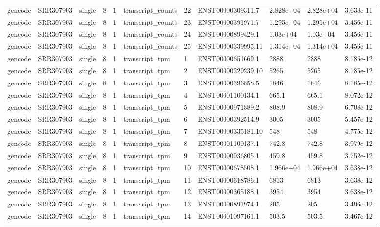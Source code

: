 \begin{tabular}{lllllllllll}
gencode & SRR307903 & single & 8 & 1 & transcript\_counts & 22 & ENST00000309311.7 & 2.828e+04 & 2.828e+04 & 3.638e-11 \\
gencode & SRR307903 & single & 8 & 1 & transcript\_counts & 23 & ENST00000391971.7 & 1.295e+04 & 1.295e+04 & 3.456e-11 \\
gencode & SRR307903 & single & 8 & 1 & transcript\_counts & 24 & ENST00000899429.1 & 1.03e+04 & 1.03e+04 & 3.456e-11 \\
gencode & SRR307903 & single & 8 & 1 & transcript\_counts & 25 & ENST00000339995.11 & 1.314e+04 & 1.314e+04 & 3.456e-11 \\
gencode & SRR307903 & single & 8 & 1 & transcript\_tpm & 1 & ENST00000651669.1 & 2888 & 2888 & 8.185e-12 \\
gencode & SRR307903 & single & 8 & 1 & transcript\_tpm & 2 & ENST00000229239.10 & 5265 & 5265 & 8.185e-12 \\
gencode & SRR307903 & single & 8 & 1 & transcript\_tpm & 3 & ENST00000396858.5 & 1846 & 1846 & 8.185e-12 \\
gencode & SRR307903 & single & 8 & 1 & transcript\_tpm & 4 & ENST00001100134.1 & 665.1 & 665.1 & 8.072e-12 \\
gencode & SRR307903 & single & 8 & 1 & transcript\_tpm & 5 & ENST00000971889.2 & 808.9 & 808.9 & 6.708e-12 \\
gencode & SRR307903 & single & 8 & 1 & transcript\_tpm & 6 & ENST00000392514.9 & 3005 & 3005 & 5.457e-12 \\
gencode & SRR307903 & single & 8 & 1 & transcript\_tpm & 7 & ENST00000335181.10 & 548 & 548 & 4.775e-12 \\
gencode & SRR307903 & single & 8 & 1 & transcript\_tpm & 8 & ENST00001100137.1 & 742.8 & 742.8 & 3.979e-12 \\
gencode & SRR307903 & single & 8 & 1 & transcript\_tpm & 9 & ENST00000936805.1 & 459.8 & 459.8 & 3.752e-12 \\
gencode & SRR307903 & single & 8 & 1 & transcript\_tpm & 10 & ENST00000678508.1 & 1.966e+04 & 1.966e+04 & 3.638e-12 \\
gencode & SRR307903 & single & 8 & 1 & transcript\_tpm & 11 & ENST00000618786.1 & 6813 & 6813 & 3.638e-12 \\
gencode & SRR307903 & single & 8 & 1 & transcript\_tpm & 12 & ENST00000365188.1 & 3954 & 3954 & 3.638e-12 \\
gencode & SRR307903 & single & 8 & 1 & transcript\_tpm & 13 & ENST00000891974.1 & 205 & 205 & 3.496e-12 \\
gencode & SRR307903 & single & 8 & 1 & transcript\_tpm & 14 & ENST00001097161.1 & 503.5 & 503.5 & 3.467e-12 \\

\end{tabular}

